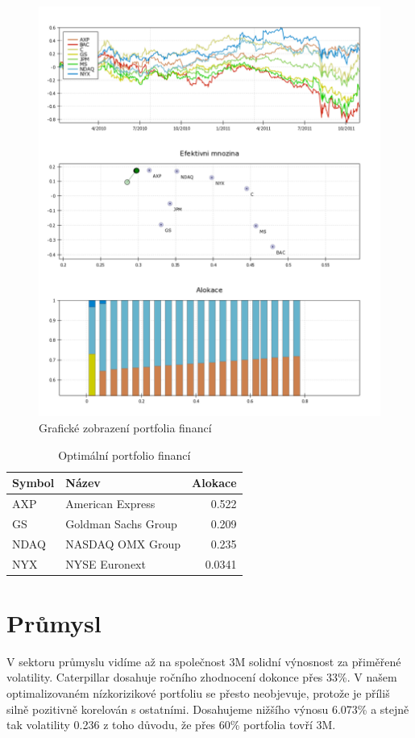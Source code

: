 \documentclass[12pt,a4paper]{report}
\begin{document}
    \begin{figure}[htb]
      \centering
        \includegraphics[height=0.90\textheight]{fin1.png}
       \caption{Grafické zobrazení portfolia financí}
    \end{figure}

    \begin{table}[htb]
      \centering
      \begin{tabular}{|l|l|r|}
        \hline
        Symbol&Název&Alokace\\\hline\hline
        AXP&American Express &0.522\\\hline
        GS&Goldman Sachs Group &0.209\\\hline
        NDAQ&NASDAQ OMX Group &0.235\\\hline
        NYX&NYSE Euronext &0.0341\\\hline
      \end{tabular}
      \caption{Optimální portfolio financí}
    \end{table}
    
  \clearpage
  \section{Průmysl}
    V sektoru průmyslu vidíme až na společnost 3M solidní výnosnost za přiměřené volatility. Caterpillar dosahuje ročního zhodnocení dokonce přes 33\%. V našem optimalizovaném nízkorizikové portfoliu se přesto neobjevuje, protože je příliš silně pozitivně korelován s ostatními. Dosahujeme nižšího výnosu 6.073\% a stejně tak volatility 0.236 z toho důvodu, že přes 60\%  portfolia tovří 3M.
    
\end{document}
